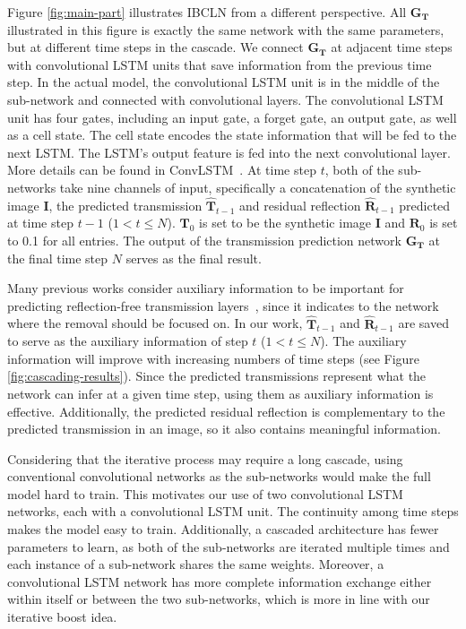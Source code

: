 \documentclass[10pt,twocolumn,letterpaper]{article}
\begin{document}
Figure \ref{fig:main-part} illustrates IBCLN from a different perspective. All $\bm{G_T}$ illustrated in this figure is exactly the same network with the same parameters, but at different time steps in the cascade. We connect $\bm{G_T}$ at adjacent time steps with convolutional LSTM units that save information from the previous time step. In the actual model, the convolutional LSTM unit is in the middle of the sub-network and connected with convolutional layers. The convolutional LSTM unit has four gates, including an input gate, a forget gate, an output gate, as well as a cell state. The cell state encodes the state information that will be fed to the next LSTM. The LSTM’s output feature is fed into the next convolutional layer. More details can be found in ConvLSTM~\cite{xingjian2015convolutional}. At time step $t$, both of the sub-networks take nine channels of input, specifically a concatenation of the synthetic image $\mathbf{I}$, the predicted transmission $\mathbf{\hat{T}}_{t-1}$ and residual reflection $\mathbf{\hat{R}}_{t-1}$ predicted at time step $t-1$ ($1 < {t} \leq N$). $\mathbf{T}_0$ is set to be the synthetic image $\mathbf{I}$ and $\mathbf{R}_0$ is set to 0.1 for all entries. The output of the transmission prediction network $\bm{G_T}$ at the final time step $N$ serves as the final result.

Many previous works consider auxiliary information to be important for predicting reflection-free transmission layers~\cite{fan2017generic, yang2018seeing, wan2018crrn, wen2019single}, since it indicates to the network where the removal should be focused on. In our work, $\mathbf{\hat{T}}_{t-1}$ and $\mathbf{\hat{R}}_{t-1}$ are saved to serve as the auxiliary information of step $t$ ($1 < {t} \leq N$). The auxiliary information will improve with increasing numbers of time steps (see Figure \ref{fig:cascading-results}). Since the predicted transmissions represent what the network can infer at a given time step,
using them as auxiliary information is effective. Additionally, the predicted residual reflection is complementary to the predicted transmission in an image, so it also contains meaningful information. 

Considering that the iterative process may require a long cascade, using conventional convolutional networks as the sub-networks would make the full model hard to train. This motivates our use of two convolutional LSTM networks, each with a convolutional LSTM unit. The continuity among time steps makes the model easy to train. 
Additionally, a cascaded architecture has fewer parameters to learn, as both of the sub-networks are iterated multiple times and each instance of a sub-network shares the same weights.
Moreover, a convolutional LSTM network has more complete information exchange either within itself or between the two sub-networks, which is more in line with our iterative boost idea. 
\end{document}
